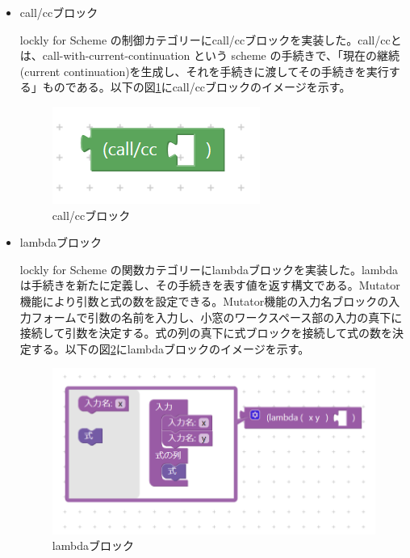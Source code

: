 \documentclass{risepaper}
\begin{document}
\begin{itemize}
\item call/ccブロック

lockly for Scheme の制御カテゴリーにcall/ccブロックを実装した。call/ccとは、call-with-current-continuation という scheme の手続きで、「現在の継続(current continuation)を生成し、それを手続きに渡してその手続きを実行する」ものである。以下の図\ref{fig:scheme_callcc}にcall/ccブロックのイメージを示す。

\begin{figure}[h]
\begin{center}
\includegraphics[scale=0.8]{img/scheme_callcc.PNG}
\caption{call/ccブロック}%
\label{fig:scheme_callcc}
\end{center}%
\end{figure}%

\item lambdaブロック

lockly for Scheme の関数カテゴリーにlambdaブロックを実装した。lambdaは手続きを新たに定義し、その手続きを表す値を返す構文である。Mutator機能により引数と式の数を設定できる。Mutator機能の入力名ブロックの入力フォームで引数の名前を入力し、小窓のワークスペース部の入力の真下に接続して引数を決定する。式の列の真下に式ブロックを接続して式の数を決定する。以下の図\ref{fig:scheme_lambda}にlambdaブロックのイメージを示す。

\begin{figure}[h]
\begin{center}
\includegraphics[scale=0.8]{img/scheme_lambda.PNG}
\caption{lambdaブロック}%
\label{fig:scheme_lambda}
\end{center}%
\end{figure}%


\end{itemize}
\end{document}
